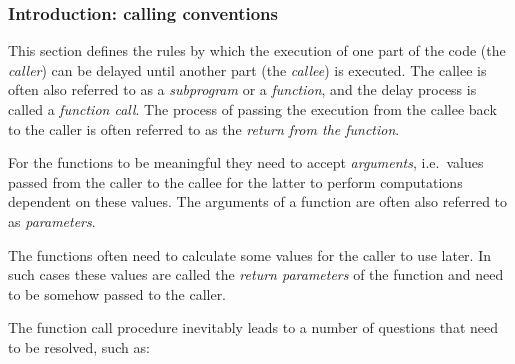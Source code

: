 \hypertarget{functions:introduction}{
    \subsubsection{Introduction: calling conventions}
}

This section defines the rules by which the execution of one part of the code
(the \textit{caller}) can be delayed until another part (the \textit{callee})
is executed.
The callee is often also referred to as a \textit{subprogram} or
a \textit{function}, and the delay process is called a \textit{function call}.
The process of passing the execution from the callee back to the caller
is often referred to as the \textit{return from the function}.

For the functions to be meaningful they need to accept \textit{arguments},
i.e.\ values passed from the caller to the callee for the latter to perform
computations dependent on these values.
The arguments of a function are often
also referred to as \textit{parameters}.

The functions often need to calculate some values for the caller to use later.
In such cases these values are called the \textit{return parameters}
of the function and need to be somehow passed to the caller.

The function call procedure inevitably leads to a number of questions that
need to be resolved, such as:

